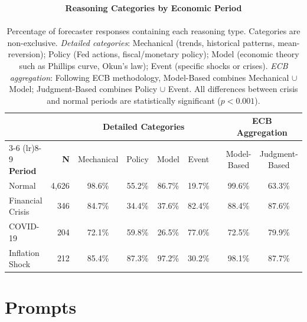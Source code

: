 \documentclass[11pt,letterpaper]{scrartcl}
\begin{document}
\begin{table}[!htbp]
\centering
\footnotesize
\begin{tabular}{lrccccccc}
\toprule
& & \multicolumn{4}{c}{\textbf{Detailed Categories}} & & \multicolumn{2}{c}{\textbf{ECB Aggregation}} \\
\cmidrule(lr){3-6} \cmidrule(lr){8-9}
\textbf{Period} & \textbf{N} & Mechanical & Policy & Model & Event & & Model-Based & Judgment-Based \\
\midrule
Normal & 4,626 & 98.6\% & 55.2\% & 86.7\% & 19.7\% & & 99.6\% & 63.3\% \\
Financial Crisis & 346 & 84.7\% & 34.4\% & 37.6\% & 82.4\% & & 88.4\% & 87.6\% \\
COVID-19 & 204 & 72.1\% & 59.8\% & 26.5\% & 77.0\% & & 72.5\% & 79.9\% \\
Inflation Shock & 212 & 85.4\% & 87.3\% & 97.2\% & 30.2\% & & 98.1\% & 87.7\% \\
\bottomrule
\end{tabular}
\caption{\textbf{Reasoning Categories by Economic Period}\\
\vspace{5pt}\\
\footnotesize{Percentage of forecaster responses containing each reasoning type. Categories are non-exclusive. \textit{Detailed categories}: Mechanical (trends, historical patterns, mean-reversion); Policy (Fed actions, fiscal/monetary policy); Model (economic theory such as Phillips curve, Okun's law); Event (specific shocks or crises). \textit{ECB aggregation}: Following ECB methodology, Model-Based combines Mechanical $\cup$ Model; Judgment-Based combines Policy $\cup$ Event. All differences between crisis and normal periods are statistically significant ($p < 0.001$).}}
\label{tab:reasoning_categories}
\end{table}
\clearpage

\section*{Prompts}
\setcounter{figure}{0}
\renewcommand{\figurename}{Prompt}
\end{document}
